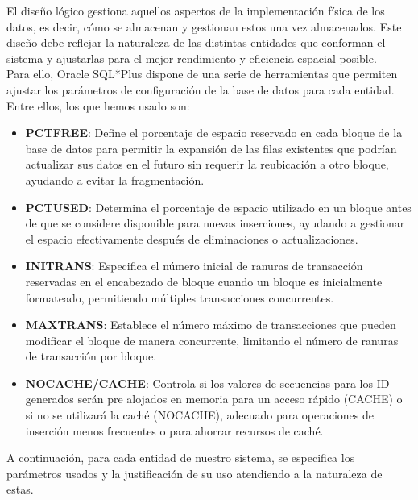 El diseño lógico gestiona aquellos aspectos de la implementación física de los datos, es decir, cómo se almacenan y gestionan estos una vez almacenados. Este diseño debe reflejar la naturaleza de las distintas entidades que conforman el sistema y ajustarlas para el mejor rendimiento y eficiencia espacial posible. \\

Para ello, Oracle SQL*Plus dispone de una serie de herramientas que permiten ajustar los parámetros de configuración de la base de datos para cada entidad. Entre ellos, los que hemos usado son:
\begin{itemize}
    \item \textbf{PCTFREE}: Define el porcentaje de espacio reservado en cada bloque de la base de datos para permitir la expansión de las filas existentes que podrían actualizar sus datos en el futuro sin requerir la reubicación a otro bloque, ayudando a evitar la fragmentación.
    \item \textbf{PCTUSED}: Determina el porcentaje de espacio utilizado en un bloque antes de que se considere disponible para nuevas inserciones, ayudando a gestionar el espacio efectivamente después de eliminaciones o actualizaciones.
    \item \textbf{INITRANS}: Especifica el número inicial de ranuras de transacción reservadas en el encabezado de bloque cuando un bloque es inicialmente formateado, permitiendo múltiples transacciones concurrentes.
    \item \textbf{MAXTRANS}: Establece el número máximo de transacciones que pueden modificar el bloque de manera concurrente, limitando el número de ranuras de transacción por bloque.
    \item \textbf{NOCACHE/CACHE}: Controla si los valores de secuencias para los ID generados serán pre alojados en memoria para un acceso rápido (CACHE) o si no se utilizará la caché (NOCACHE), adecuado para operaciones de inserción menos frecuentes o para ahorrar recursos de caché.
\end{itemize}

A continuación, para cada entidad de nuestro sistema, se especifica los parámetros usados y la justificación de su uso atendiendo a la naturaleza de estas.

